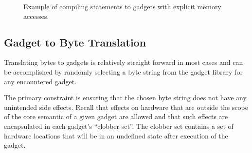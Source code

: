     \begin{figure}
        \centering
        \caption{Example of compiling statements to gadgets with explicit memory
        accesses.}
        \label{fig:method-direct-to-gadget}
    \end{figure}

    \subsection{Gadget to Byte Translation}

    Translating bytes to gadgets is relatively straight forward in most cases
    and can be accomplished by randomly selecting a byte string from the gadget
    library for any encountered gadget.

    The primary constraint is ensuring that the chosen byte string does not have
    any unintended side effects. Recall that effects on hardware that are
    outside the scope of the core semantic of a given gadget are allowed and
    that such effects are encapsulated in each gadget's ``clobber set''. The
    clobber set contains a set of hardware locations that will be in an
    undefined state after execution of the gadget.

